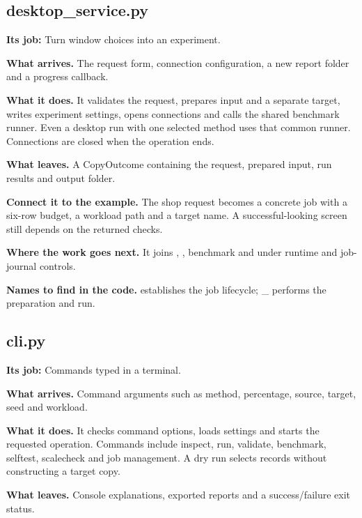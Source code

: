 
\subsection{desktop\_service.py}

\textbf{Its job:} Turn window choices into an experiment.

\textbf{What arrives.} The request form, connection configuration, a new report folder and a progress callback.

\textbf{What it does.} It validates the request, prepares input and a separate target, writes experiment settings, opens connections and calls the shared benchmark runner. Even a desktop run with one selected method uses that common runner. Connections are closed when the operation ends.

\textbf{What leaves.} A CopyOutcome containing the request, prepared input, run results and output folder.

\textbf{Connect it to the example.} The shop request becomes a concrete job with a six-row budget, a workload path and a target name. A successful-looking screen still depends on the returned checks.

\textbf{Where the work goes next.} It joins , , benchmark and  under runtime and job-journal controls.

\textbf{Names to find in the code.}  establishes the job lifecycle; \_ performs the preparation and run.


\subsection{cli.py}

\textbf{Its job:} Commands typed in a terminal.

\textbf{What arrives.} Command arguments such as method, percentage, source, target, seed and workload.

\textbf{What it does.} It checks command options, loads settings and starts the requested operation. Commands include inspect, run, validate, benchmark, selftest, scalecheck and job management. A dry run selects records without constructing a target copy.

\textbf{What leaves.} Console explanations, exported reports and a success/failure exit status.

